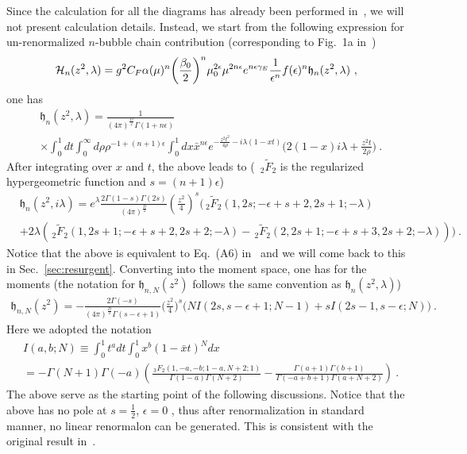\documentclass[a4paper,11pt]{article}
\begin{document}
Since the calculation for all the diagrams has already been performed in~\cite{Braun:2018brg}, we will not present calculation details. Instead, we start from the following expression for un-renormalized $n$-bubble chain contribution (corresponding to Fig.~1a in~\cite{Braun:2018brg})
\begin{align}
{\cal H}_{n}(z^2,\lambda)=g^2C_F\alpha(\mu)^n\bigg(\frac{\beta_0}{2}\bigg)^n\mu_0^{2\epsilon}\mu^{2n\epsilon}e^{n\epsilon \gamma_E}\frac{1}{\epsilon^n}f(\epsilon)^n \mathfrak{h}_n(z^2,\lambda) \ ,
\end{align}
one has
\begin{align}
&\mathfrak{h}_n(z^2,\lambda)=\frac{1}{(4\pi)^{\frac{D}{2}}\Gamma(1+n\epsilon)}\nonumber \\ 
&\times\int_{0}^{1}dt \int_{0}^{\infty} d\rho \rho^{-1+(n+1)\epsilon}\int_0^1dx \bar x^{n\epsilon}e^{-\frac{z^2t^2}{4\rho}-i\lambda(1- x t)} \bigg(2(1-x)i\lambda+\frac{z^2t}{2\rho}\bigg) \ .
\end{align}
After integrating over $x$ and $t$, the above leads to ( $\, _2\tilde{F}_2$ is the regularized hypergeometric function and $s=(n+1)\epsilon$) 
\begin{align}\label{eq:bubblecoord}
&\mathfrak{h}_n(z^2,i\lambda)=e^{\lambda}\frac{2\Gamma(1-s)\Gamma(2s)}{(4\pi)^{\frac{D}{2}}}\left(\frac{z^2}{4}\right)^s\bigg( \, _2\tilde{F}_2(1,2 s;-\epsilon+s+2,2 s+1;-\lambda)\nonumber \\ 
&+2 \lambda \left(\, _2\tilde{F}_2(1,2 s+1;-\epsilon+s+2,2 s+2;-\lambda)-\, _2\tilde{F}_2(2,2 s+1;-\epsilon+s+3,2 s+2;-\lambda)\right)\bigg) \ .
\end{align}
Notice that the above is equivalent to Eq.~(A6) in~\cite{Braun:2018brg} and we will come back to this in Sec.~\ref{sec:resurgent}. Converting into the moment space, one has for the moments (the notation for $\mathfrak{h}_{n,N}(z^2)$ follows the same convention as $\mathfrak{h}_n(z^2,\lambda)$)
\begin{align}\label{eq:bubblemoment}
\mathfrak{h}_{n,N}(z^2)=-\frac{2\Gamma(-s)}{(4\pi)^{\frac{D}{2}}\Gamma(s-\epsilon+1)}\bigg(\frac{z^2}{4}\bigg)^s\bigg(NI(2s,s-\epsilon+1;N-1)+sI(2s-1,s-\epsilon;N)\bigg) \ .
\end{align} 
Here we adopted the notation  
\begin{align}
&I(a,b;N)\equiv \int_{0}^1 t^a dt\int_{0}^1 x^b \left(1-\bar x t\right)^Ndx
\nonumber \\ 
&=-\Gamma(N+1)\Gamma (-a)\left( \frac{\, _3F_2(1,-a,-b;1-a,N+2;1)}{\Gamma(1-a)\Gamma(N+2)}-\frac{\Gamma(a+1) \Gamma (b+1)}{\Gamma (-a+b+1) \Gamma (a+N+2)}\right) \ .
\end{align}
The above serve as the starting point of the following discussions. Notice that the above has no pole at $s=\frac{1}{2}$, $\epsilon=0$ , thus after renormalization in standard manner, no linear renormalon can be generated. This is consistent with the original result in~\cite{Braun:2018brg}. 
\end{document}
